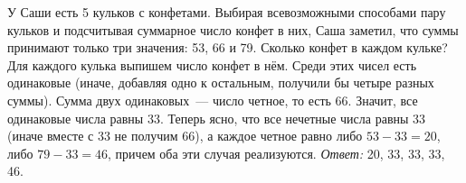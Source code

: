 \problem{}
У Саши есть 5 кульков с конфетами.
Выбирая всевозможными способами пару кульков и подсчитывая суммарное число
конфет в них, Саша заметил, что суммы принимают только три значения:
53, 66 и 79.
Сколько конфет в каждом кульке?
\solution
Для каждого кулька выпишем число конфет в нём.
Среди этих чисел есть одинаковые
(иначе, добавляя одно к остальным, получили бы четыре разных суммы).
Сумма двух одинаковых~--- число четное, то есть 66.
Значит, все одинаковые числа равны 33.
Теперь ясно, что все нечетные числа равны 33
(иначе вместе с 33 не получим 66), а каждое четное равно
либо $53 - 33 = 20$, либо $79 - 33 = 46$, причем оба эти случая реализуются.
\emph{Ответ:} 20, 33, 33, 33, 46.
\endproblem
